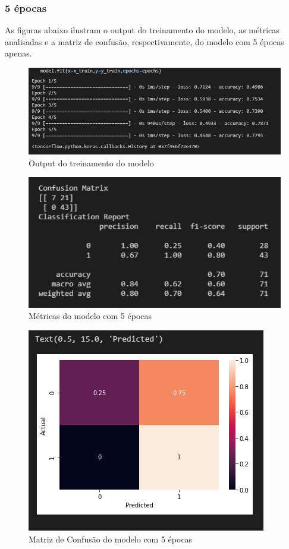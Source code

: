 \documentclass[12pt]{article}
\begin{document}
\subsubsection{5 épocas}

As figuras abaixo ilustram o output do treinamento do modelo, as métricas analisadas e a matriz de confusão, respectivamente, do modelo com 5 épocas apenas.

\begin{figure}[H]
	\centering
	\includegraphics[width=0.7\linewidth]{Imagens/5epocas/fit5epocas}
	\caption{Output do treinamento do modelo}
	\label{fig:fit5epocas}
\end{figure}
\begin{figure}[H]
	\centering
	\includegraphics[width=0.7\linewidth]{Imagens/5epocas/metricas5epocas}
	\caption{Métricas do modelo com 5 épocas}
	\label{fig:metricas5epocas}
\end{figure}
\begin{figure}[H]
	\centering
	\includegraphics[width=0.7\linewidth]{Imagens/5epocas/confusao5epocas}
	\caption{Matriz de Confusão do modelo com 5 épocas}
	\label{fig:confusao5epocas}
\end{figure}
\end{document}
